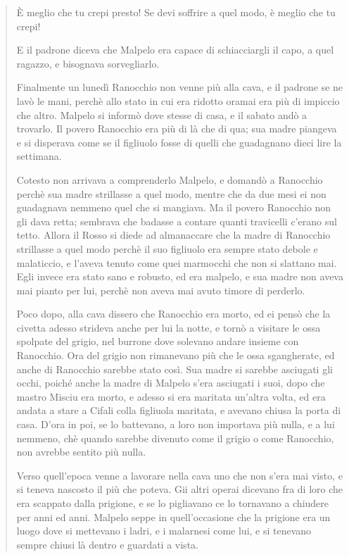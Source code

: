 \documentclass{book}
\newcounter{mar}
\begin{document}
\begin{quote}
 È meglio che tu crepi presto! Se devi soffrire a quel modo, è meglio che tu crepi!
 
 E il padrone diceva che Malpelo era capace di schiacciargli il capo, a quel ragazzo, e bisognava sorvegliarlo.
 
 Finalmente un lunedì Ranocchio non venne più alla cava, e il padrone se ne lavò le mani, perchè allo stato in cui era ridotto oramai era più di impiccio che altro. Malpelo si informò dove stesse di casa, e il sabato andò a trovarlo. Il povero Ranocchio era più di là che di qua; sua madre piangeva e si disperava come se il figliuolo fosse di quelli che guadagnano dieci lire la settimana.
 
 Cotesto non arrivava a comprenderlo Malpelo, e domandò a Ranocchio perchè sua madre strillasse a quel modo, mentre che da due mesi ei non guadagnava nemmeno quel che si mangiava. Ma il povero Ranocchio non gli dava retta; sembrava che badasse a contare quanti travicelli c’erano sul tetto. Allora il Rosso si diede ad almanaccare che la madre di Ranocchio strillasse a quel modo perchè il suo figliuolo era sempre stato debole e malaticcio, e l’aveva tenuto come quei marmocchi che non si slattano mai. Egli invece era stato sano e robusto, ed era malpelo, e sua madre non aveva mai pianto per lui, perchè non aveva mai avuto timore di perderlo.
 
 Poco dopo, alla cava dissero che Ranocchio era morto, ed ei pensò che la civetta adesso strideva anche per lui la notte, e tornò a visitare le ossa spolpate del grigio, nel burrone dove solevano andare insieme con Ranocchio. Ora del grigio non rimanevano più che le ossa sgangherate, ed anche di Ranocchio sarebbe stato così. Sua madre si sarebbe asciugati gli occhi, poiché anche la madre di Malpelo s’era asciugati i suoi, dopo che mastro Misciu era morto, e adesso si era maritata un’altra volta, ed era andata a stare a Cifali colla figliuola maritata, e avevano chiusa la porta di casa. D’ora in poi, se lo battevano, a loro non importava più nulla, e a lui nemmeno, chè quando sarebbe divenuto come il grigio o come Ranocchio, non avrebbe sentito più nulla.
 
 Verso quell’epoca venne a lavorare nella cava uno che non s’era mai visto, e si teneva nascosto il più che poteva. Gii altri operai dicevano fra di loro che era scappato dalla prigione, e se lo pigliavano ce lo tornavano a chiudere per anni ed anni. Malpelo seppe in quell’occasione che la prigione era un luogo dove si mettevano i ladri, e i malarnesi come lui, e si tenevano sempre chiusi là dentro e guardati a vista.
 

\end{quote}
\end{document}
